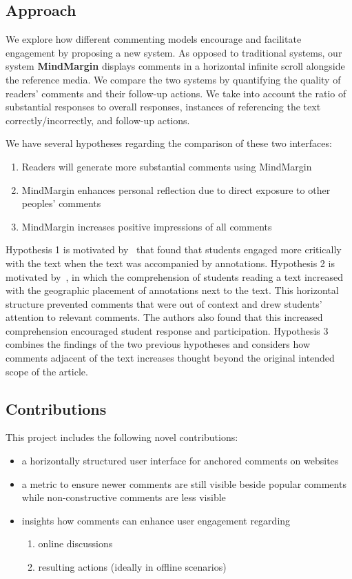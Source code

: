 \subsection{Approach}

We explore how different commenting models encourage and facilitate engagement by proposing a new system. As opposed to traditional systems, our system \textbf{MindMargin} displays comments in a horizontal infinite scroll alongside the reference media. We compare the two systems by quantifying the quality of readers' comments and their follow-up actions. We take into account the ratio of substantial responses to overall responses, instances of referencing the text correctly/incorrectly, and follow-up actions.

We have several hypotheses regarding the comparison of these two interfaces:
\begin{enumerate}
\item Readers will generate more substantial comments using MindMargin
\item MindMargin enhances personal reflection due to direct exposure to other peoples' comments
\item MindMargin increases positive impressions of all comments
\end{enumerate}

Hypothesis 1 is motivated by~\cite{AnnotationsStudents} that found that students engaged more critically with the text when the text was accompanied by annotations. 
Hypothesis 2 is motivated by~\cite{NB}, in which the comprehension of students reading a text increased with the geographic placement of annotations next to the text. This horizontal structure prevented comments that were out of context and drew students' attention to relevant comments. The authors also found that this increased comprehension encouraged student response and participation.
Hypothesis 3 combines the findings of the two previous hypotheses and considers how comments adjacent of the text increases thought beyond the original intended scope of the article.

\subsection{Contributions}

This project includes the following novel contributions:

\begin{itemize}
\item a horizontally structured user interface for anchored comments on websites
\item a metric to ensure newer comments are still visible beside popular comments while non-constructive comments are less visible
\item insights how comments can enhance user engagement regarding
\begin{enumerate}
\item online discussions
\item resulting actions (ideally in offline scenarios)
\end{enumerate}

\end{itemize}